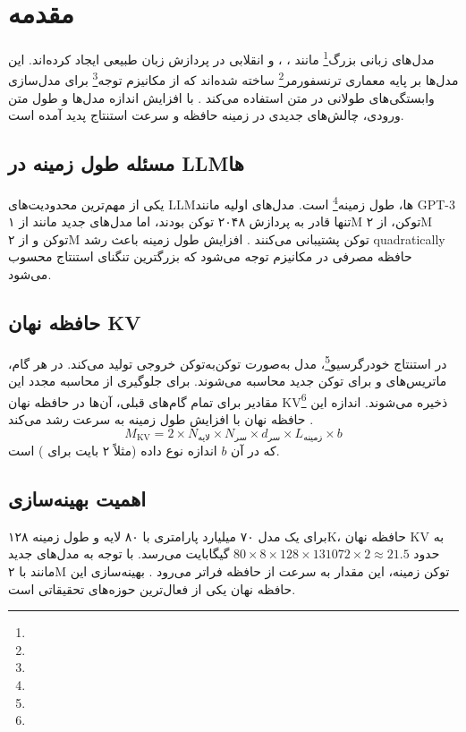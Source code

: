 \chapter{مقدمه}
\label{chap:intro}

مدل‌های زبانی بزرگ\footnote{} مانند ، ،  و  انقلابی در پردازش زبان طبیعی ایجاد کرده‌اند. این مدل‌ها بر پایه معماری ترنسفورمر\footnote{} ساخته شده‌اند که از مکانیزم توجه\footnote{} برای مدل‌سازی وابستگی‌های طولانی در متن استفاده می‌کند \cite{vaswani2017attention}. با افزایش اندازه مدل‌ها و طول متن ورودی، چالش‌های جدیدی در زمینه حافظه و سرعت استنتاج پدید آمده است.

\section{مسئله طول زمینه در LLMها}
یکی از مهم‌ترین محدودیت‌های LLMها، طول زمینه\footnote{} است. مدل‌های اولیه مانند GPT-3 تنها قادر به پردازش ۲۰۴۸ توکن بودند، اما مدل‌های جدید مانند  از ۱M توکن،  از ۲M توکن و  از ۲M توکن پشتیبانی می‌کنند \cite{child2019generating}. افزایش طول زمینه باعث رشد quadratically حافظه مصرفی در مکانیزم توجه می‌شود که بزرگترین تنگنای استنتاج محسوب می‌شود.

\section{حافظه نهان KV}
در استنتاج خودرگرسیو\footnote{}، مدل به‌صورت توکن‌به‌توکن خروجی تولید می‌کند. در هر گام، ماتریس‌های  و  برای توکن جدید محاسبه می‌شوند. برای جلوگیری از محاسبه مجدد این مقادیر برای تمام گام‌های قبلی، آن‌ها در حافظه نهان KV\footnote{} ذخیره می‌شوند. اندازه این حافظه نهان با افزایش طول زمینه به سرعت رشد می‌کند \cite{pope2023efficiently}.
\begin{equation}
\label{eq:cache_size}
M_{\text{KV}} = 2 \times N_{\text{لایه}} \times N_{\text{سر}} \times d_{\text{سر}} \times L_{\text{زمینه}} \times b
\end{equation}
که در آن $b$ اندازه نوع داده (مثلاً ۲ بایت برای ) است.

\section{اهمیت بهینه‌سازی}
برای یک مدل ۷۰ میلیارد پارامتری با ۸۰ لایه و طول زمینه ۱۲۸K، حافظه نهان KV به حدود $80 \times 8 \times 128 \times 131072 \times 2 \approx 21.5$ گیگابایت می‌رسد. با توجه به مدل‌های جدید مانند  با ۲M توکن زمینه، این مقدار به سرعت از حافظه  فراتر می‌رود \cite{kwon2023efficient}. بهینه‌سازی این حافظه نهان یکی از فعال‌ترین حوزه‌های تحقیقاتی است.


